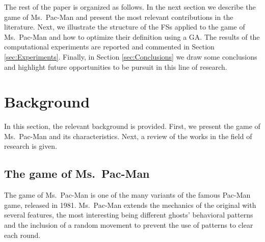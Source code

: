 \documentclass[journal]{IEEEtran}
\begin{document}
The rest of the paper is organized as follows. In the next section we describe the game of Ms.\  Pac-Man and present the most relevant contributions in the literature. Next, we illustrate the structure of the FSs applied to the game of Ms.\  Pac-Man and how to optimize their definition using a GA. The results of the computational experiments are reported and commented in Section \ref{sec:Experiments}. Finally, in Section \ref{sec:Conclusions} we draw some conclusions and highlight future opportunities to be pursuit in this line of research.

\section{Background}
\label{sec:Background}
In this section, the relevant background is provided. First, we present the game of Ms.\  Pac-Man and its characteristics. Next, a review of the works in the field of research is given.

\subsection{The game of Ms.\  Pac-Man}
\label{subsec:GameMsPacMan}
The game of Ms.\  Pac-Man is one of the many variants of the famous
Pac-Man game, released in 1981. Ms.\  Pac-Man  extends the mechanics of
the original with several features, the most interesting being
different ghosts' behavioral patterns and the inclusion of a random
movement to prevent the use of patterns to clear each round.
\end{document}
